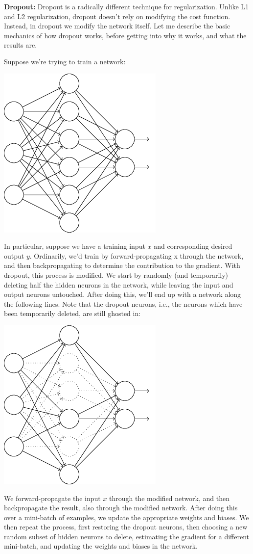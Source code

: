 \documentclass[a4paper,twoside,10pt]{book}
\begin{document}
\textbf{Dropout:} Dropout is a radically different technique for regularization. Unlike L1 and L2 regularization, dropout doesn't rely on modifying the cost function. Instead, in dropout we modify the network itself. Let me describe the basic mechanics of how dropout works, before getting into why it works, and what the results are.

Suppose we're trying to train a network:
\begin{center}
	\includegraphics[width=0.55\linewidth]{figures/ch3/tikz30}
\end{center}
In particular, suppose we have a training input $x$ and corresponding desired output $y$. Ordinarily, we'd train by forward-propagating x through the network, and then backpropagating to determine the contribution to the gradient. With dropout, this process is modified. We start by randomly (and temporarily) deleting half the hidden neurons in the network, while leaving the input and output neurons untouched. After doing this, we'll end up with a network along the following lines. Note that the dropout neurons, i.e., the neurons which have been temporarily deleted, are still ghosted in:
\begin{center}
	\includegraphics[width=0.55\linewidth]{figures/ch3/tikz31}
\end{center}
We forward-propagate the input $x$ through the modified network, and then backpropagate the result, also through the modified network. After doing this over a mini-batch of examples, we update the appropriate weights and biases. We then repeat the process, first restoring the dropout neurons, then choosing a new random subset of hidden neurons to delete, estimating the gradient for a different mini-batch, and updating the weights and biases in the network.
\end{document}
